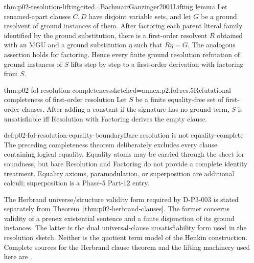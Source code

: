 \begin{hbtheorem}{thm:p02-resolution-lifting}{cited=BachmairGanzinger2001}{Lifting lemma}
Let renamed-apart clauses \(C,D\) have disjoint variable sets, and let \(G\)
be a ground resolvent of ground instances of them.  After factoring each
parent literal family identified by the ground substitution, there is a
first-order resolvent \(R\) obtained with an MGU and a ground substitution
\(\eta\) such that \(R\eta=G\).  The analogous assertion holds for
factoring.  Hence every finite ground resolution refutation of ground
instances of \(S\) lifts step by step to a first-order derivation with
factoring from \(S\).
\end{hbtheorem}

\begin{hbtheorem}{thm:p02-fol-resolution-completeness}{sketched=annex:p2.fol.res.5}{Refutational completeness of first-order resolution}
Let \(S\) be a finite equality-free set of first-order clauses.  After adding
a constant if the signature has no ground term, \(S\) is unsatisfiable iff
Resolution with Factoring derives the empty clause.
\end{hbtheorem}

\begin{hbwarning}{def:p02-fol-resolution-equality-boundary}{Bare resolution is not equality-complete}
The preceding completeness theorem deliberately excludes every clause
containing logical equality.  Equality atoms may be carried through the sheet
for soundness, but bare Resolution and Factoring do not provide a complete
identity treatment.  Equality axioms, paramodulation, or superposition are
additional calculi; superposition is a Phase-5 Part-12 entry.
\end{hbwarning}

The Herbrand universe/structure validity form required by D-P3-003 is stated
separately from Theorem~\ref{thm:p02-herbrand-clauses}.  The former concerns
validity of a prenex existential sentence and a finite disjunction of its
ground instances.  The latter is the dual universal-clause unsatisfiability
form used in the resolution sketch.  Neither is the quotient term model of
the Henkin construction.
Complete sources for the Herbrand clause theorem and the lifting machinery
used here are \cite{Robinson1965,BachmairGanzinger2001}.
